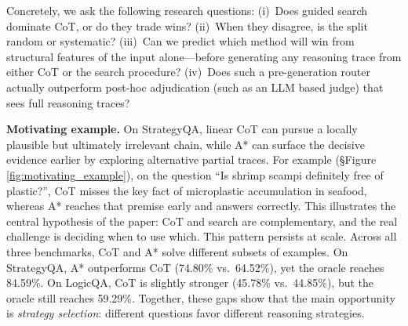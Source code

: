 \documentclass{article}
\begin{document}
Concretely, we ask the following research questions: (i)~Does guided search dominate CoT, or do they trade wins? (ii)~When they disagree, is the split random or systematic? (iii)~Can we predict which method will win from structural features of the input alone---before generating any reasoning trace from either CoT or the search procedure? (iv)~Does such a pre-generation router actually outperform post-hoc adjudication (such as an LLM based judge) that sees full reasoning traces?





\textbf{Motivating example.} On StrategyQA, linear CoT can pursue a locally plausible but ultimately irrelevant chain, while A* can surface the decisive evidence earlier by exploring alternative partial traces. For example (\S Figure \ref{fig:motivating_example}), on the question ``Is shrimp scampi definitely free of plastic?'', CoT misses the key fact of microplastic accumulation in seafood, whereas A* reaches that premise early and answers correctly. This illustrates the central hypothesis of the paper: CoT and search are complementary, and the real challenge is deciding when to use which. This pattern persists at scale. Across all three benchmarks, CoT and A* solve different subsets of examples. On StrategyQA, A* outperforms CoT (74.80\% vs.\ 64.52\%), yet the oracle reaches 84.59\%. On LogicQA, CoT is slightly stronger (45.78\% vs.\ 44.85\%), but the oracle still reaches 59.29\%. Together, these gaps show that the main opportunity is \emph{strategy selection}: different questions favor different reasoning strategies.
\end{document}
